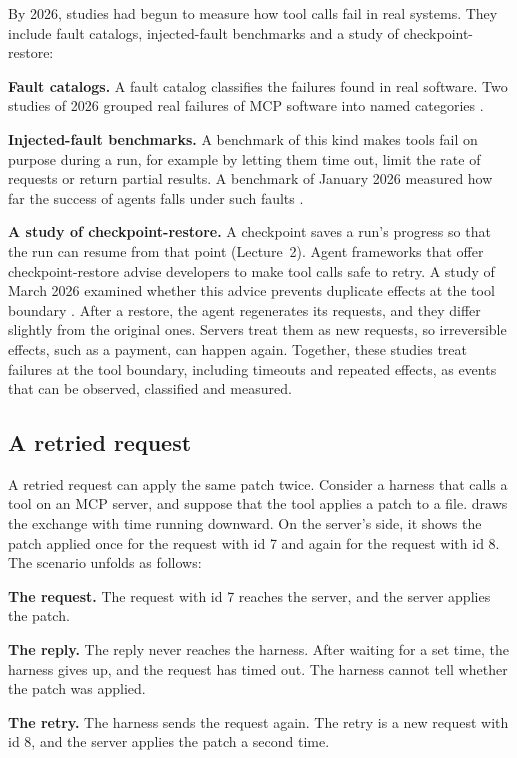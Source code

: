 By 2026, studies had begun to measure how tool calls fail in real systems. They include fault
catalogs, injected-fault benchmarks and a study of checkpoint-restore:
\bi
\item \textbf{Fault catalogs.} A fault catalog classifies the failures found in real software. Two
studies of 2026 grouped real failures of MCP software into named categories
\citep{taraghi2026mcpfaults,owotogbe2026mcpruntime}.
\item \textbf{Injected-fault benchmarks.} A benchmark of this kind makes tools fail on purpose
during a run, for example by letting them time out, limit the rate of requests or return partial
results. A benchmark of January 2026 measured how far the success of agents falls under such faults
\citep{gupta2026reliabilitybench}.
\item \textbf{A study of checkpoint-restore.} A checkpoint saves a run's progress so that the run can
resume from that point (Lecture~2). Agent frameworks that offer checkpoint-restore advise developers
to make tool calls safe to retry. A study of March 2026 examined whether this advice prevents
duplicate effects at the tool boundary \citep{zheng2026acrfence}. After a restore, the agent
regenerates its requests, and they differ slightly from the original ones. Servers treat them as new
requests, so irreversible effects, such as a payment, can happen again.
\ei
Together, these studies treat failures at the tool boundary, including timeouts and repeated
effects, as events that can be observed, classified and measured.

\subsection{A retried request}
\label{sec:toolcalls-retry}

A retried request can apply the same patch twice. Consider a harness that calls a tool on an MCP
server, and suppose that the tool applies a patch to a file.  draws the
exchange with time running downward. On the server's side, it shows the patch applied once for the
request with id 7 and again for the request with id 8. The scenario unfolds as follows:
\bi
\item \textbf{The request.} The request with id 7 reaches the server, and the server applies the
patch.
\item \textbf{The reply.} The reply never reaches the harness. After waiting for a set time, the
harness gives up, and the request has timed out. The harness cannot tell whether the patch was
applied.
\item \textbf{The retry.} The harness sends the request again. The retry is a new request with id 8,
and the server applies the patch a second time.
\ei

